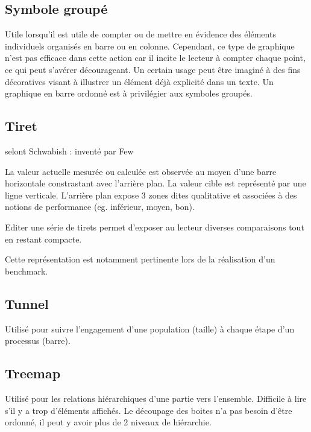 \documentclass[a4paper,12pt]{article}
\begin{document}
\begin{multicols}{2}
\subsection*{Symbole groupé}
\label{sec:orgc242a23}
Utile lorsqu'il est utile de compter ou de mettre en évidence des éléments individuels organisés en barre ou en colonne. \autocite{alansmithLexiqueVisuel} Cependant, ce type de graphique n'est pas efficace dans cette action car il incite le lecteur à compter chaque point, ce qui peut s'avérer décourageant. \autocite{stephenfewSillyGraphsThat2012} Un certain usage peut être imaginé à des fins décoratives visant à illustrer un élément déjà explicité dans un texte. Un graphique en barre ordonné est à privilégier aux symboles groupés.
\subsection*{Tiret}
\label{sec:org59b72c8}
selont Schwabish : inventé par Few

La valeur actuelle mesurée ou calculée est observée au moyen d'une barre horizontale constrastant avec l'arrière plan. \autocite{jonathanschwabishComparingCategories2021}
La valeur cible est représenté par une ligne verticale. \autocite{alansmithLexiqueVisuel}
L'arrière plan expose 3 zones dites qualitative et associées à des notions de performance (eg. inférieur, moyen, bon). \autocite{sosulskiGraphics2019}

Editer une série de tirets permet d'exposer au lecteur diverses comparaisons tout en restant compacte. \autocite{jonathanschwabishComparingCategories2021}

Cette représentation est notamment pertinente lors de la réalisation d'un benchmark. \autocite{mikeyiHowChooseRight2020}
\subsection*{Tunnel}
\label{sec:orga1af0d6}
Utilisé pour suivre l'engagement d'une population (taille) à chaque étape d'un processus (barre). \autocite{mikeyiHowChooseRight2020}
\subsection*{Treemap}
\label{sec:org8f28470}
Utilisé pour les relations hiérarchiques d'une partie vers l'ensemble. Difficile à lire s'il y a trop d'éléments affichés. \autocite{alansmithLexiqueVisuel}
Le découpage des boites n'a pas besoin d'être ordonné, il peut y avoir plus de 2 niveaux de hiérarchie. \autocite{mikeyiHowChooseRight2020}

\end{multicols}
\end{document}
